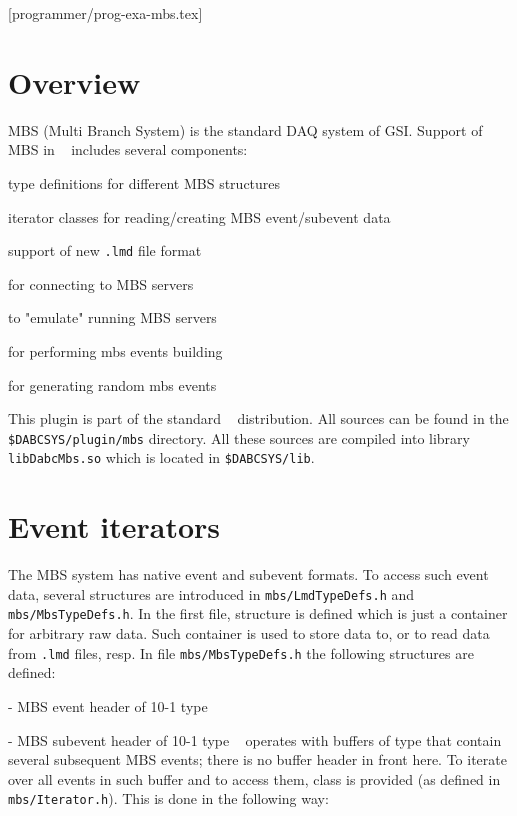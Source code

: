 [programmer/prog-exa-mbs.tex]

\section{Overview}

MBS (Multi Branch System) is the standard DAQ system of GSI.
Support of MBS in \dabc~ includes several components:
\bbul
\item type definitions for different MBS structures  
\item iterator classes for reading/creating MBS event/subevent data 
\item support of new {\tt .lmd} file format  
\item {} for connecting to MBS servers  
\item {} to "emulate" running MBS servers  
\item {} for performing mbs events building   
\item {} for generating random mbs events 
\ebul

This plugin is part of the standard \dabc~ distribution.  
All sources can be found in the {\tt \$DABCSYS/plugin/mbs} directory.
All these sources are compiled into library {\tt libDabcMbs.so}
which is located in {\tt \$DABCSYS/lib}. 

\section{Event iterators}

The MBS system has native event and subevent formats. 
To access such event data, several structures are introduced in 
{\tt mbs/LmdTypeDefs.h} and {\tt mbs/MbsTypeDefs.h}.
In the first file, structure  is defined
which is just a container for arbitrary raw data. 
Such container is used to store data to, or to read data from 
{\tt .lmd} files, resp.
In file {\tt mbs/MbsTypeDefs.h} the following structures are defined:
\bbul
\item {} - MBS event header of 10-1 type 
\item {} - MBS subevent header of 10-1 type 
\ebul
\dabc~ operates with buffers of type  that contain
several subsequent MBS events; there is no buffer header in front here. 
To iterate over all events in such
buffer and to access them, class  is provided 
(as defined in {\tt mbs/Iterator.h}).  
This is done in the following way:

